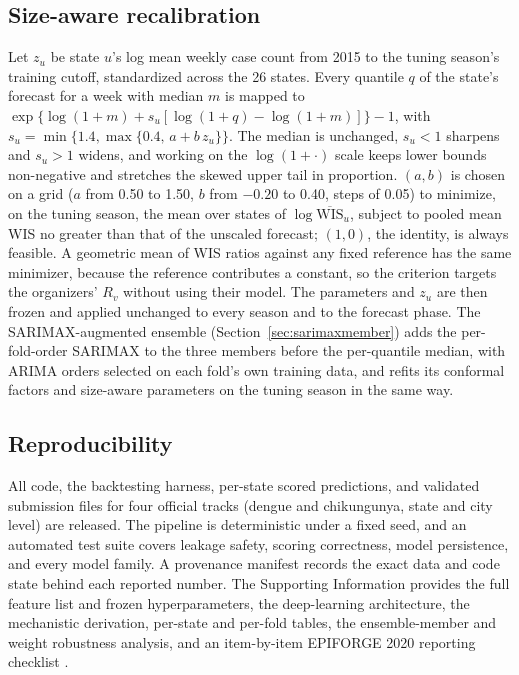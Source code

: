 \documentclass[11pt]{article}
\begin{document}
\subsection{Size-aware recalibration}\label{sec:methods-sizeaware}
Let $z_u$ be state $u$'s log mean weekly case count from 2015 to the tuning season's training cutoff,
standardized across the 26 states. Every quantile $q$ of the state's forecast for a week with median
$m$ is mapped to $\exp\{\log(1+m)+s_u[\log(1+q)-\log(1+m)]\}-1$, with
$s_u=\min\{1.4,\max\{0.4,\,a+b\,z_u\}\}$. The median is unchanged, $s_u<1$ sharpens and $s_u>1$
widens, and working on the $\log(1+\cdot)$ scale keeps lower bounds non-negative and stretches the
skewed upper tail in proportion. $(a,b)$ is chosen on a grid ($a$ from 0.50 to 1.50, $b$ from
$-0.20$ to 0.40, steps of 0.05) to minimize, on the tuning season, the mean over states of
$\log\overline{\mathrm{WIS}}_u$, subject to pooled mean WIS no greater than that of the unscaled
forecast; $(1,0)$, the identity, is always feasible. A geometric mean of WIS ratios against any
fixed reference has the same minimizer, because the reference contributes a constant, so the
criterion targets the organizers' $R_v$ without using their model. The parameters and $z_u$ are
then frozen and applied unchanged to every season and to the forecast phase. The SARIMAX-augmented
ensemble (Section~\ref{sec:sarimaxmember}) adds the per-fold-order SARIMAX to the three members
before the per-quantile median, with ARIMA orders selected on each fold's own training data, and
refits its conformal factors and size-aware parameters on the tuning season in the same way.

\subsection{Reproducibility}
All code, the backtesting harness, per-state scored predictions, and validated submission files for
four official tracks (dengue and chikungunya, state and city level) are released. The pipeline is
deterministic under a fixed seed, and an automated test suite covers leakage safety, scoring
correctness, model persistence, and every model family. A provenance manifest records the exact data
and code state behind each reported number. The Supporting Information provides the full feature list
and frozen hyperparameters, the deep-learning architecture, the mechanistic derivation, per-state and
per-fold tables, the ensemble-member and weight robustness analysis, and an item-by-item EPIFORGE 2020
reporting checklist \citep{pollett2021}.
\end{document}

